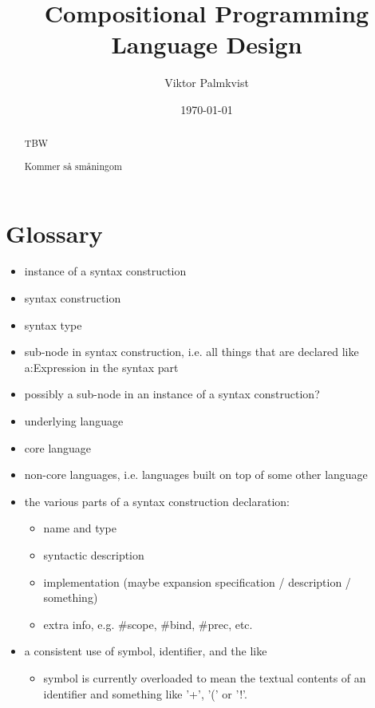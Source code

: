 \documentclass{kththesis}
\title{Compositional Programming Language Design}
\author{Viktor Palmkvist}
\date{\today}
\begin{document}
\frontmatter

\titlepage

\begin{abstract}
TBW
\end{abstract}


\begin{otherlanguage}{swedish}
\begin{abstract}
Kommer så småningom
\end{abstract}
\end{otherlanguage}


\tableofcontents


\mainmatter


\chapter{Glossary}
\begin{itemize}
  \item instance of a syntax construction
  \item syntax construction
  \item syntax type
  \item sub-node in syntax construction, i.e. all things that are declared like a:Expression in the syntax part
  \item possibly a sub-node in an instance of a syntax construction?
  \item underlying language
  \item core language
  \item non-core languages, i.e. languages built on top of some other language
  \item the various parts of a syntax construction declaration:
  \begin{itemize}
    \item name and type
    \item syntactic description
    \item implementation (maybe expansion specification / description / something)
    \item extra info, e.g. \#scope, \#bind, \#prec, etc.
  \end{itemize}
  \item a consistent use of symbol, identifier, and the like
  \begin{itemize}
    \item symbol is currently overloaded to mean the textual contents of an identifier and something like '+', '(' or '!'.
  \end{itemize}
\end{itemize}
\end{document}
